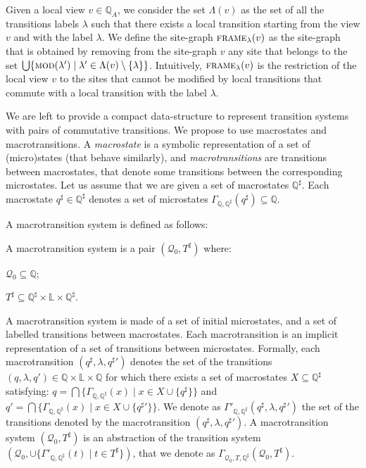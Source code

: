 \documentclass[10pt,a4paper]{llncs}
\newcommand{\states}{\mathbb{Q}}
\newcommand{\localstates}[1][A]{\states_{#1}}
\newcommand{\labels}{\mathbb{L}}
\newcommand{\transitionsystemwoparentheses}{\mathcal{Q}_0,T}
\newcommand{\macrostates}{\states^{\sharp}}
\newcommand{\gammamacro}{\Gamma_{\states,\states^{\sharp}}}
\newcommand{\gammamacrotransitions}{\Gamma'_{\states,\states^{\sharp}}}
\newcommand{\modif}[1][r,n]{\textsc{mod}(#1)}
\newcommand{\gammamacrotransitionsystem}{\Gamma_{\transitionsystemwoparentheses,\states^{\sharp}}}
\renewcommand{\frame}[2][\lambda]{\textsc{frame}_{#1}(#2)}
\begin{document}
Given a local view $v\in\localstates$, we consider the set
$\Lambda(v)$ as the set of all the transitions labels $\lambda$ such that there exists a local transition starting from the view $v$ and with the label $\lambda$. We define the site-graph $\frame{v}$ as the site-graph that is obtained by removing from the site-graph $v$ any site that belongs to the set $\bigcup \{\modif[\lambda']\;|\;\lambda'\in\Lambda(v)\setminus\{\lambda\}\}$. Intuitively, $\frame{v}$ is the restriction of the local view $v$ to the sites that cannot be modified by local transitions that commute with a local transition with the label $\lambda$.


We are left to provide a compact data-structure to  represent  transition
systems with pairs of commutative transitions.
We propose to use macrostates and macrotransitions. A \emph{macrostate} is a symbolic representation of a set of (micro)states (that behave similarly),
and \emph{macrotransitions} are  transitions between macrostates, that denote some  transitions between the corresponding microstates.
Let us assume that we are given  a set of macrostates $\macrostates$. Each macrostate $q^{\sharp}\in\macrostates$ denotes a set of microstates $\gammamacro(q^{\sharp})\subseteq \states$.

A macrotransition system is defined as follows:
\begin{definition}
A macrotransition system is a pair $(\mathcal{Q}_0,T^{\sharp})$ where:
\begin{inparaenum}
\item $\mathcal{Q}_0 \subseteq \states$;
\item $T^{\sharp} \subseteq \macrostates \times \labels \times \macrostates$.
\end{inparaenum}
\end{definition}

A macrotransition system is made of a set of initial microstates, and a set of labelled transitions between macrostates. Each macrotransition is an implicit representation of a set of transitions between microstates. Formally, each macrotransition $(q^{\sharp},\lambda,q^{\sharp}{}')$  denotes the set of the transitions $(q,\lambda,q')\in \states\times\labels\times \states$ for which there exists a set of macrostates $X\subseteq \macrostates$ satisfying: $q = \bigcap \{\gammamacro(x)\;|\; x\in X\cup \{q^{\sharp}\}\}$ and $q' = \bigcap \{\gammamacro(x) \;|\; x \in X\cup \{q^{\sharp}{}'\}\}$.
We denote as $\gammamacrotransitions(q^{\sharp},\lambda,q^{\sharp}{}')$ the set of the transitions denoted by the macrotransition $(q^{\sharp},\lambda,q^{\sharp}{}')$.
 A macrotransition system $(\mathcal{Q}_0,T^{\sharp})$ is an abstraction of the transition system $(\mathcal{Q}_0,\cup \{\gammamacrotransitions(t)\;|\;t\in T^{\sharp}\})$, that we denote as $\gammamacrotransitionsystem(\mathcal{Q}_0,T^{\sharp})$.
\end{document}
